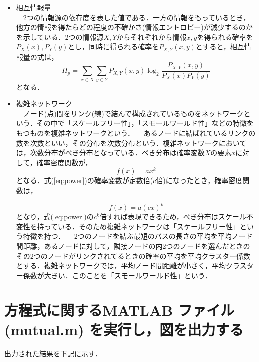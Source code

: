 \documentclass[autodetect-engine,dvipdfmx-if-dvi,ja=standard,a4paper,11pt]{bxjsarticle} %
\begin{document}
\begin{itemize}
\item 相互情報量\\%
　2つの情報源の依存度を表した値である．一方の情報をもっているとき，他方の情報を得たらどの程度の不確かさ(情報エントロピー)が減少するのかを示している．2つの情報源$X,Y$からそれぞれから情報$x,y$を得られる確率を$P_X(x),P_Y(y)$とし，同時に得られる確率を$P_{X,Y}(x,y)$とすると，相互情報量の式は，
\begin{equation}
H_p=\displaystyle\sum_{x\in X}\displaystyle\sum_{y\in Y} P_{X,Y}(x,y) \log_2 \dfrac{P_{X,Y}(x,y)}{P_X(x)P_Y(y)}
\end{equation}
となる\cite{mutual}．
　
\\

\item 複雑ネットワーク\cite{net} \\%
　ノード(点)間をリンク(線)で結んで構成されているものをネットワークという．その中で「スケールフリー性」，「スモールワールド性」などの特徴をもつものを複雑ネットワークという．
　あるノードに結ばれているリンクの数を次数といい，その分布を次数分布という．複雑ネットワークにおいては，次数分布がべき分布となっている．べき分布は確率変数$X$の要素$x$に対して，確率密度関数が，
\begin{equation}
\label{eq:power}
f(x)=ax^k
\end{equation}
となる．式(\ref{eq:power})の確率変数が定数倍($c$倍)になったとき，確率密度関数は，

\begin{equation}
\label{eq:power2}
f(x)=a(cx)^k
\end{equation}
となり，式(\ref{eq:power})の$c^k$倍すれば表現できるため，べき分布はスケール不変性を持っている．そのため複雑ネットワークは「スケールフリー性」という特徴を持つ．
　2つのノードを結ぶ最短のパスの長さの平均を平均ノード間距離，あるノードに対して，隣接ノードの内2つのノードを選んだときのその2つのノードがリンクされてるときの確率の平均を平均クラスター係数とする．複雑ネットワークでは，平均ノード間距離が小さく，平均クラスター係数が大きい．このことを「スモールワールド性」という．
\\

\end{itemize}


\section{ 方程式に関するMATLAB ファイル(mutual.m) を実行し，図を出力する}
出力された結果を下記に示す．
\end{document}
